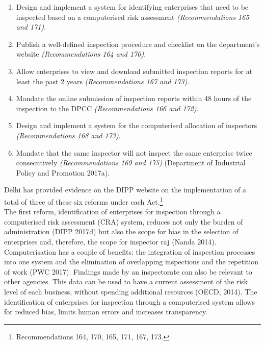 \documentclass[a4paper, 12pt]{article}
\begin{document}
                 \begin{enumerate}
                 \item Design and implement a system for identifying enterprises that need to be inspected based on a computerised risk assessment \textit{(Recommendations 165 and 171)}.
                 \item Publish a well-defined inspection procedure and checklist on the department’s website \textit{(Recommendations 164 and 170)}.
                 \item Allow enterprises to view and download submitted inspection reports for at least the past 2 years \textit{(Recommendations 167 and 173)}.
                 \item Mandate the online submission of inspection reports within 48 hours of the inspection to the DPCC \textit{(Recommendations 166 and 172)}.
                 \item Design and implement a system for the computerised allocation of inspectors \textit{(Recommendations 168 and 173)}.
                 \item Mandate that the same inspector will not inspect the same enterprise twice consecutively \textit{(Recommendations 169 and 175)} (Department of Industrial Policy and Promotion 2017a).
                 \end{enumerate}
                 
                 Delhi has provided evidence on the DIPP website on the implementation of a total of three of these six reforms under each Act.\footnote{Recommendations 164, 170, 165, 171, 167, 173.} \\
                 
                 The first reform, identification of enterprises for inspection through a computerised risk assessment (CRA) system, reduces not only the burden of administration (DIPP 2017d) but also the scope for bias in the selection of enterprises and, therefore, the scope for inspector raj (Nanda 2014). \\
                 
                 Computerisation has a couple of benefits: the integration of inspection processes into one system and the elimination of overlapping inspections and the repetition of work (PWC 2017). Findings made by an inspectorate can also be relevant to other agencies. This data can be used to have a current assessment of the risk level of each business, without spending additional resources (OECD, 2014). The identification of enterprises for inspection through a computerised system allows for reduced bias, limits human errors and increases transparency. \\
                 
\end{document}
